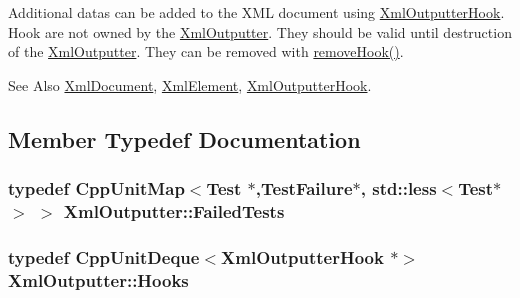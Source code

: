 Additional datas can be added to the X\-M\-L document using \hyperlink{class_xml_outputter_hook}{Xml\-Outputter\-Hook}. Hook are not owned by the \hyperlink{class_xml_outputter}{Xml\-Outputter}. They should be valid until destruction of the \hyperlink{class_xml_outputter}{Xml\-Outputter}. They can be removed with \hyperlink{class_xml_outputter_ac4659712ab6b0f168119a22fbdb70255}{remove\-Hook()}.

\begin{DoxySeeAlso}{See Also}
\hyperlink{class_xml_document}{Xml\-Document}, \hyperlink{class_xml_element}{Xml\-Element}, \hyperlink{class_xml_outputter_hook}{Xml\-Outputter\-Hook}. 
\end{DoxySeeAlso}


\subsection{Member Typedef Documentation}
\hypertarget{class_xml_outputter_a987608d04ba56dcc13461c9522f3da7e}{
\subsubsection[{Failed\-Tests}]{\setlength{\rightskip}{0pt plus 5cm}typedef {\bf Cpp\-Unit\-Map}$<${\bf Test} $\ast$,{\bf Test\-Failure}$\ast$, std\-::less$<${\bf Test}$\ast$$>$ $>$ {\bf Xml\-Outputter\-::\-Failed\-Tests}}}\label{class_xml_outputter_a987608d04ba56dcc13461c9522f3da7e}
\hypertarget{class_xml_outputter_a721fa60bda8d779457ae8e429be21d74}{
\subsubsection[{Hooks}]{\setlength{\rightskip}{0pt plus 5cm}typedef {\bf Cpp\-Unit\-Deque}$<${\bf Xml\-Outputter\-Hook} $\ast$$>$ {\bf Xml\-Outputter\-::\-Hooks}\hspace{0.3cm}{\ttfamily [protected]}}}\label{class_xml_outputter_a721fa60bda8d779457ae8e429be21d74}


